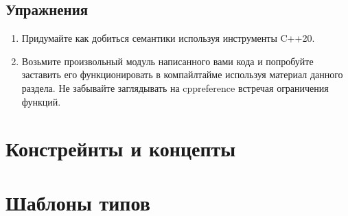 \subsection*{Упражнения}
\begin{enumerate}
\item Придумайте как добиться семантики  используя инструменты C++20.
\item Возьмите произвольный модуль написанного вами кода и попробуйте заставить его функционировать в компайлтайме используя материал данного раздела.
Не забывайте заглядывать на cppreference встречая ограничения  функций.
\end{enumerate}

\section{Констрейнты и концепты}


\section{Шаблоны типов}
